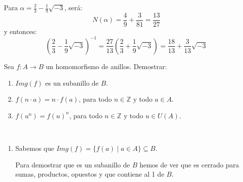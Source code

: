 \documentclass[12pt]{article}
\begin{document}
\begin{ejercicio}[4 puntos]
\begin{enumerate}[label=(\alph*)]
                Para $\alpha = \frac{2}{3}-\frac{1}{9}\sqrt{-3}$, será:
                \begin{equation*}
                    N(\alpha) = \dfrac{4}{9}+\dfrac{3}{81} = \dfrac{13}{27}
                \end{equation*}
                y entonces:
                \begin{equation*}
                    {\left(\dfrac{2}{3}-\dfrac{1}{9}\sqrt{-3}\right)}^{-1} = \dfrac{27}{13} \left(\dfrac{2}{3}+\dfrac{1}{9}\sqrt{-3}\right) = \dfrac{18}{13} + \dfrac{3}{13}\sqrt{-3}
                \end{equation*}
        \end{enumerate}
    \end{ejercicio}

    \begin{ejercicio}[3 puntos]
        Sea $f:A\rightarrow B$ un homomorfismo de anillos. Demostrar:
        \begin{enumerate}[label=(\alph*)]
            \item $Img(f)$ es un subanillo de $B$.
            \item $f(n\cdot a) = n\cdot f(a)$, para todo $n\in \mathbb{Z}$ y todo $a\in A$.
            \item $f(u^n) = f(u)^n$, para todo $n\in \mathbb{Z}$ y todo $u\in U(A)$.
        \end{enumerate}~\\
        \begin{enumerate}[label=(\alph*)]
            \item Sabemos que $Img(f)=\{f(a)\mid a\in A\}\subseteq B$.

                Para demostrar que es un subanillo de $B$ hemos de ver que es cerrado para sumas, productos, opuestos y que contiene al 1 de $B$.


\end{enumerate}
\end{ejercicio}
\end{document}
